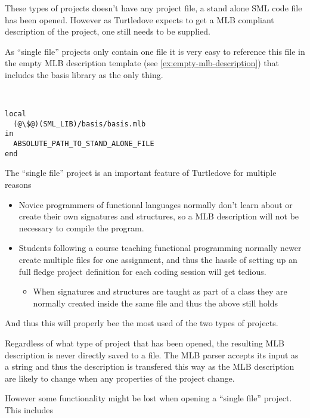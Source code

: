 These types of projects doesn't have any project file, a stand alone SML code
file has been opened. However as Turtledove expects to get a MLB compliant
description of the project, one still needs to be supplied.

As ``single file'' projects only contain one file it is very easy to reference
this file in the empty MLB description template (see
\ref{ex:empty-mlb-description}) that includes the basis library as the only
thing.

\begin{example}\
\begin{lstlisting}
local
  (@\$@)(SML_LIB)/basis/basis.mlb
in
  ABSOLUTE_PATH_TO_STAND_ALONE_FILE
end
\end{lstlisting}  
\end{example}


The ``single file'' project is an important feature of Turtledove for multiple
reasons

\begin{itemize}
\item Novice programmers of functional languages normally don't learn about or
  create their own signatures and structures, so a MLB description will not be
  necessary to compile the program.
  
\item Students following a course teaching functional programming normally newer
  create multiple files for one assignment, and thus the hassle of setting up an
  full fledge project definition for each coding session will get tedious.
  
  \begin{itemize}
  \item When signatures and structures are taught as part of a class they are
    normally created inside the same file and thus the above still holds
  \end{itemize}
\end{itemize}

And thus this will properly bee the most used of the two types of projects.

Regardless of what type of project that has been opened, the resulting MLB
description is never directly saved to a file. The MLB parser accepts its input
as a string and thus the description is transfered this way as the MLB
description are likely to change when any properties of the project change.

However some functionality might be lost when opening a ``single file''
project. This includes

